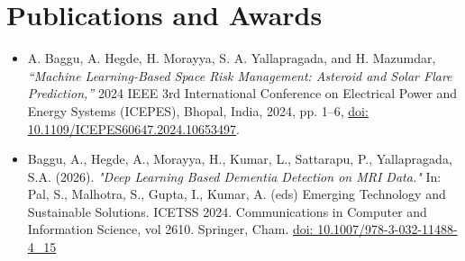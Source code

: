 \documentclass[letterpaper,11pt]{article}
\newcommand{\resumeItem}[1]{
  \item\small{
    {#1 \vspace{-2pt}}
  }
}
\newcommand{\resumeItemListStart}{\begin{itemize}}
\newcommand{\resumeItemListEnd}{\end{itemize}\vspace{-5pt}}
\begin{document}
\section{Publications and Awards}
\resumeItemListStart
\resumeItem{A. Baggu, A. Hegde, H. Morayya, S. A. Yallapragada, and H. Mazumdar, \textit{“Machine Learning-Based Space Risk Management: Asteroid and Solar Flare Prediction,”} 2024 IEEE 3rd International Conference on Electrical Power and Energy Systems (ICEPES), Bhopal, India, 2024, pp. 1–6, \href{https://doi.org/10.1109/ICEPES60647.2024.10653497}{doi: 10.1109/ICEPES60647.2024.10653497}.}
\resumeItem{Baggu, A., Hegde, A., Morayya, H., Kumar, L., Sattarapu, P., Yallapragada, S.A. (2026). \textit{"Deep Learning Based Dementia Detection on MRI Data."} In: Pal, S., Malhotra, S., Gupta, I., Kumar, A. (eds) Emerging Technology and Sustainable Solutions. ICETSS 2024. Communications in Computer and Information Science, vol 2610. Springer, Cham. \href{https://doi.org/10.1007/978-3-032-11488-4_15}{doi: 10.1007/978-3-032-11488-4\_15}}
\resumeItemListEnd
\end{document}

